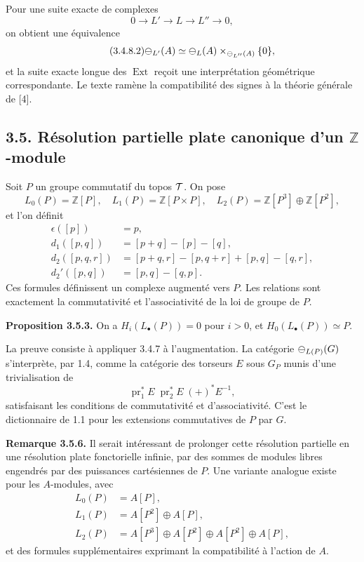 \documentclass[11pt]{article}
\providecommand{\Z}{\mathbb Z}
\providecommand{\pr}{\operatorname{pr}}
\providecommand{\Ext}{\operatorname{Ext}}
\begin{document}
Pour une suite exacte de complexes
\begin{equation}\tag{3.4.8.1}
  0\to L'\to L\to L''\to0,
\end{equation}
on obtient une équivalence
\begin{equation}\tag{3.4.8.2}
  \mathcal\Psi_{L'}(A)\simeq \mathcal\Psi_L(A)\times_{\mathcal\Psi_{L''}(A)}\{0\},
\end{equation}
et la suite exacte longue des \(\Ext\) re\c coit une interpr\'etation g\'eom\'etrique correspondante.  Le texte ram\`ene la compatibilit\'e des signes \`a la th\'eorie g\'en\'erale de [4].

\subsection*{3.5. R\'esolution partielle plate canonique d'un \(\Z\)-module}
Soit \(P\) un groupe commutatif du topos \(\mathcal T\).  On pose
\begin{equation}\tag{3.5.1}
  L_0(P)=\Z[P],\quad L_1(P)=\Z[P\times P],\quad
  L_2(P)=\Z[P^3]\oplus\Z[P^2],
\end{equation}
et l'on d\'efinit
\begin{align}\tag{3.5.2}
 \epsilon([p])&=p,\\
 d_1([p,q])&=[p+q]-[p]-[q],\\
 d_2([p,q,r])&=[p+q,r]-[p,q+r]+[p,q]-[q,r],\\
 d_2'([p,q])&=[p,q]-[q,p].
\end{align}
Ces formules d\'efinissent un complexe augment\'e vers \(P\).  Les relations sont exactement la commutativit\'e et l'associativit\'e de la loi de groupe de \(P\).

\textbf{Proposition 3.5.3.}  On a \(H_i(L_\bullet(P))=0\) pour \(i>0\), et \(H_0(L_\bullet(P))\simeq P\).

La preuve consiste \`a appliquer 3.4.7 \`a l'augmentation.  La cat\'egorie \(\mathcal\Psi_{L(P)}(G)\) s'interpr\`ete, par 1.4, comme la cat\'egorie des torseurs \(E\) sous \(G_P\) munis d'une trivialisation de
\begin{equation}\tag{3.5.3.2}
  \pr_1^*E\;\pr_2^*E\;(+)^*E^{-1},
\end{equation}
satisfaisant les conditions de commutativit\'e et d'associativit\'e.  C'est le dictionnaire de 1.1 pour les extensions commutatives de \(P\) par \(G\).

\textbf{Remarque 3.5.6.}  Il serait int\'eressant de prolonger cette r\'esolution partielle en une r\'esolution plate fonctorielle infinie, par des sommes de modules libres engendr\'es par des puissances cart\'esiennes de \(P\).  Une variante analogue existe pour les \(A\)-modules, avec
\begin{align}\tag{3.5.9}
L_0(P)&=A[P],\\
L_1(P)&=A[P^2]\oplus A[P],\\
L_2(P)&=A[P^3]\oplus A[P^2]\oplus A[P^2]\oplus A[P],
\end{align}
et des formules suppl\'ementaires exprimant la compatibilit\'e \`a l'action de \(A\).
\end{document}
